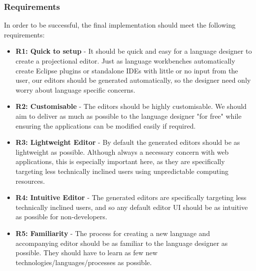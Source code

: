 \documentclass{article}
\begin{document}
\subsubsection{Requirements}\label{requirements}
In order to be successful, the final implementation should meet the following requirements: 

\begin{itemize}
\item \textbf{R1: Quick to setup} - It should be quick and easy for a language designer to create a projectional editor. Just as language workbenches automatically create Eclipse plugins or standalone IDEs with little or no input from the user, our editors should be generated automatically, so the designer need only worry about language specific concerns.
\item \textbf{R2: Customisable} - The editors should be highly customisable. We should aim to deliver as much as possible to the language designer "for free" while ensuring the applications can be modified easily if required. 
\item \textbf{R3: Lightweight Editor} - By default the generated editors should be as lightweight as possible. Although always a necessary concern with web applications, this is especially important here, as they are specifically targeting less technically inclined users using unpredictable computing resources.
\item \textbf{R4: Intuitive Editor} - The generated editors are specifically targeting less technically inclined users, and so any default editor UI should be as intuitive as possible for non-developers.
\item \textbf{R5: Familiarity} - The process for creating a new language and accompanying editor should be as familiar to the language designer as possible. They should have to learn as few new technologies/languages/processes as possible.
\end{itemize}
\end{document}
